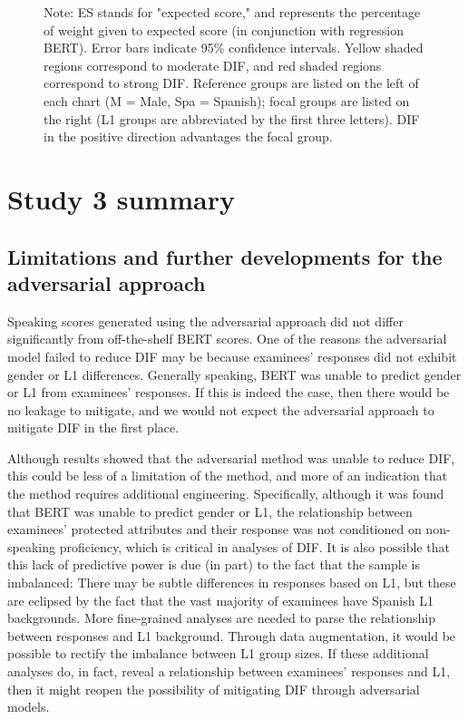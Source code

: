 \documentclass [PhD] {uclathes}
\begin{document}
\begin{figure}[!htb]
\caption*{\small Note: ES stands for "expected score," and represents the percentage of weight given to expected score (in conjunction with regression BERT). Error bars indicate 95\% confidence intervals. Yellow shaded regions correspond to moderate DIF, and red shaded regions correspond to strong DIF. Reference groups are listed on the left of each chart (M = Male, Spa = Spanish); focal groups are listed on the right (L1 groups are abbreviated by the first three letters). DIF in the positive direction advantages the focal group.}
\end{figure}

\section{Study 3 summary}
\label{sec:stdy3_sum}

\subsection{Limitations and further developments for the adversarial approach}

Speaking scores generated using the adversarial approach did not differ significantly from off-the-shelf BERT scores. One of the reasons the adversarial model failed to reduce DIF may be because examinees’ responses did not exhibit gender or L1 differences. Generally speaking, BERT was unable to predict gender or L1 from examinees’ responses. If this is indeed the case, then there would be no leakage to mitigate, and we would not expect the adversarial approach to mitigate DIF in the first place. 

Although results showed that the adversarial method was unable to reduce DIF, this could be less of a limitation of the method, and more of an indication that the method requires additional engineering. Specifically, although it was found that BERT was unable to predict gender or L1, the relationship between examinees' protected attributes and their response was not conditioned on non-speaking proficiency, which is critical in analyses of DIF. It is also possible that this lack of predictive power is due (in part) to the fact that the sample is imbalanced: There may be subtle differences in responses based on L1, but these are eclipsed by the fact that the vast majority of examinees have Spanish L1 backgrounds. More fine-grained analyses are needed to parse the relationship between responses and L1 background. Through data augmentation, it would be possible to rectify the imbalance between L1 group sizes. If these additional analyses do, in fact, reveal a relationship between examinees’ responses and L1, then it might reopen the possibility of mitigating DIF through adversarial models. 
\end{document}
